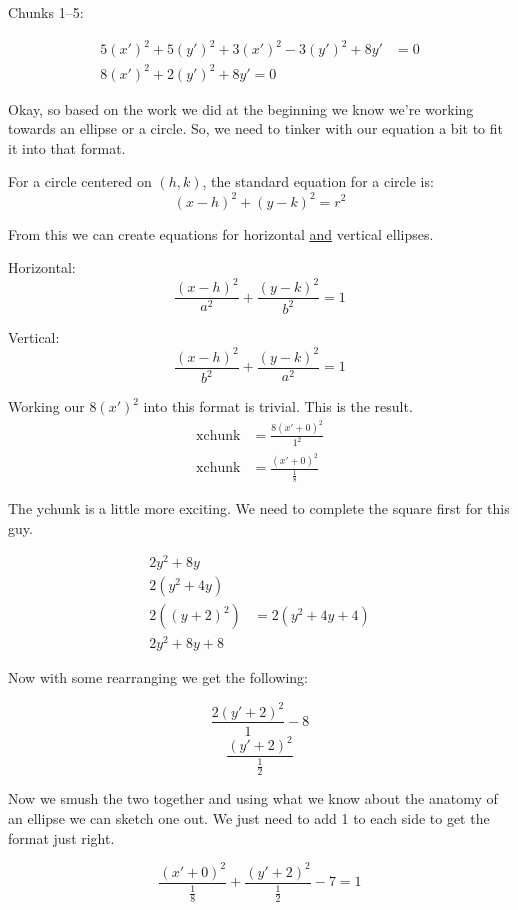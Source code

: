 \begin{solution}[Solution]
    Chunks 1--5:
    
    \begin{align}
        5(x')^2 + 5(y')^2 + 3(x')^2 - 3(y')^2 + 8y' &= 0 \\
        8(x')^2 + 2(y')^2 + 8y' = 0 
    \end{align}
    
    \pagebreak
    
    Okay, so based on the work we did at the beginning we know we're working towards an ellipse or a circle. So, we need to tinker with our equation a bit to fit it into that format. 
    
    For a circle centered on $(h,k)$, the standard equation for a circle is:
    \[(x-h)^2 + (y-k)^2 = r^2 \]
    
    From this we can create equations for horizontal \underline{and} vertical ellipses. \medskip
    
    Horizontal: 
    \[\frac{(x-h)^2}{a^2} + \frac{(y-k)^2}{b^2} = 1\]
    
    Vertical:
    \[\frac{(x-h)^2}{b^2} + \frac{(y-k)^2}{a^2} = 1\]
    
    Working our $8(x')^2$ into this format is trivial. This is the result.
    \begin{align}
        \text{xchunk} &= \frac{8(x'+0)^2}{1^2} \\
        \text{xchunk} &= \frac{(x'+0)^2}{\frac{1}{8}}
    \end{align}
    
    The ychunk is a little more exciting. We need to complete the square first for this guy.
    
    \begin{align}
        2y^2 + 8y & \\
        2(y^2 + 4y) & \\
        2((y+2)^2) &= 2(y^2 + 4y + 4) \\
        2y^2 + 8y + 8 &
    \end{align}
    
    Now with some rearranging we get the following:
    
    \[\frac{2(y'+2)^2}{1} - 8\]
    \[\frac{(y'+2)^2}{\frac{1}{2}}\]
    
    \pagebreak
    
    Now we smush the two together and using what we know about the anatomy of an ellipse we can sketch one out. We just need to add 1 to each side to get the format just right.
    
    \[ \frac{(x'+0)^2}{\frac{1}{8}} + \frac{(y'+2)^2}{\frac{1}{2}} - 7 = 1\]
    

\end{solution}
